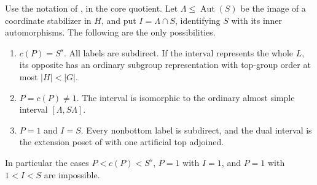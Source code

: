\begin{proposition}\label{f:prop-interval-cases}
Use the notation of , in the core quotient. Let
$\Lambda\le\operatorname{Aut}(S)$ be the image of a coordinate stabilizer
in $H$, and put $I=\Lambda\cap S$, identifying $S$ with its inner
automorphisms. The following are the only possibilities.
\begin{enumerate}[label=\textup{(\roman*)}]
\item\label{f:case-subdirect} $c(P)=S^s$. All labels are subdirect. If the
interval represents the whole $L$, its opposite has an ordinary subgroup
representation with top-group order at most $|H|<|G|$.
\item\label{f:case-product} $P=c(P)\ne1$. The interval is isomorphic to the
ordinary almost simple interval $[\Lambda,S\Lambda]$.
\item\label{f:case-extension} $P=1$ and $I=S$. Every nonbottom label is
subdirect, and the dual interval is the extension poset of
 with one artificial top adjoined.
\end{enumerate}
In particular the cases $P<c(P)<S^s$, $P=1$ with $I=1$, and $P=1$ with
$1<I<S$ are impossible.
\end{proposition}
